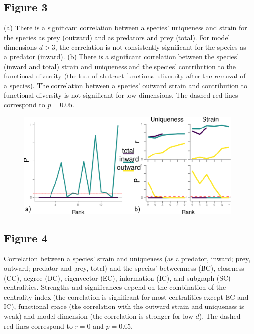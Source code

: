 \documentclass[12pt]{article}
\begin{document}
\subsection*{Figure 3}
(a) There is a significant correlation between a species' uniqueness and strain for
the species as prey (outward) and as predators and prey (total). For
model dimensions $d > 3$, the correlation is not consistently
significant for the species as a predator (inward).
(b) There is a significant correlation between the species' (inward and total) strain and
uniqueness and the species' contribution to the functional diversity (the
loss of abstract functional diversity after the removal of a species). The correlation
between a species' outward strain and contribution to functional diversity is not significant for low dimensions.
The dashed red lines correspond to $p = 0.05$.

\begin{figure}[h!]
 \centering
 \includegraphics[width=\textwidth]{./Images/Figure_3.pdf}
\end{figure}
\newpage

\subsection*{Figure 4}
Correlation between a species' strain and uniqueness
(as a predator, inward; prey, outward; predator and prey, total)
and the species' betweenness (BC), closeness (CC), degree (DC),
eigenvector (EC), information (IC), and subgraph (SC)
centralities. Strengths and significances depend on the combination
of the centrality index (the correlation is significant for most centralities
except EC and IC), functional space (the correlation with the outward strain
and uniqueness is weak) and model dimension (the correlation is stronger
for low $d$). The dashed red lines correspond to $r = 0$ and $p = 0.05$.
\end{document}
